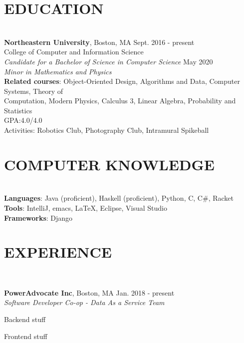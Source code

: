 \documentclass[11pt]{res}
\newcommand{\sectionunderline}{\vspace{-3mm}\hrulefill\\}
\newcommand{\listingtab}{\tabto{3.5cm}}
\newcommand{\newsect}[1]{\section{\Large \bf #1}}
\newcommand{\email}[1]{\faEnvelope\hspace{1mm} \href{mailto:#1}{#1}}
\newcommand{\phone}[1]{\faMobilePhone\hspace{1mm} #1}
\newcommand{\github}[1]{\faGithubSquare\hspace{1mm} \href{https://github.com/#1}{#1}}
\newcommand{\linkedin}[1]{\faLinkedinSquare\hspace{1mm} \href{https://linkedin.com/in/#1}{#1}}
\begin{document}
\address{
  {\color{darkgray}\footnotesize School address: 40A Leon Street \#7754, Boston, MA 02115}\\
  \footnotesize\phone{(802) 503-5089}
  \large{$\bullet$}
  \footnotesize\email{derekpham67@gmail.com}
  \large{$\bullet$}
  \footnotesize\github{derekpham}
  \large{$\bullet$}
  \footnotesize\linkedin{derek-pham97}\\
  \small Available: January - August 2019
}

\begin{resume}
  \newsect{EDUCATION}{
    \sectionunderline{
      {\bf \large Northeastern University}, Boston, MA \hfill Sept. 2016 - present\\
      College of Computer and Information Science}\\
                     {\it Candidate for a Bachelor of Science in Computer Science} \hfill May 2020\\
                     {\it Minor in Mathematics and Physics}\\
                     {\bf Related courses}:\listingtab
                     Object-Oriented Design, Algorithms and Data, Computer Systems, Theory of\\
                     \listingtab Computation, Modern Physics, Calculus 3, Linear Algebra, Probability and Statistics\\
                     GPA:\listingtab 4.0/4.0\\
                     Activities: \listingtab Robotics Club, Photography Club, Intramural Spikeball
  }

  \newsect{COMPUTER KNOWLEDGE}{
    \sectionunderline{
      {\bf Languages}: \listingtab Java (proficient), Haskell (proficient), Python, C, C\#, Racket\\
      {\bf Tools}: \listingtab IntelliJ, emacs, \LaTeX, Eclipse, Visual Studio\\
      {\bf Frameworks}: \listingtab Django
    }
  }

  \newsect{EXPERIENCE}{
    \sectionunderline{
      {\bf PowerAdvocate Inc}, Boston, MA \hfill Jan. 2018 - present\\
      {\it Software Developer Co-op - Data As a Service Team}
      \begin{itemize}
        {\item Backend stuff}
        {\item Frontend stuff}
      \end{itemize}

}}
\end{resume}
\end{document}
